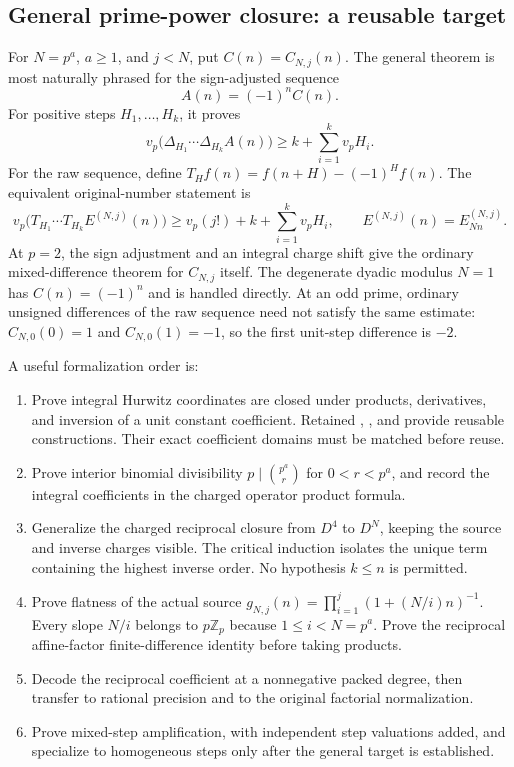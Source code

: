 \subsection{General prime-power closure: a reusable target}
For $N=p^a$, $a\ge1$, and $j<N$, put $C(n)=C_{N,j}(n)$. The general theorem is most naturally phrased for the sign-adjusted sequence
\[
 A(n)=(-1)^n C(n).
\]
For positive steps $H_1,\ldots,H_k$, it proves
\[
 v_p\bigl(\Delta_{H_1}\cdots\Delta_{H_k}A(n)\bigr)
 \ge k+\sum_{i=1}^k v_pH_i.
\]
For the raw sequence, define $T_H f(n)=f(n+H)-(-1)^Hf(n)$. The equivalent original-number statement is
\[
 v_p\bigl(T_{H_1}\cdots T_{H_k}E^{(N,j)}(n)\bigr)
 \ge v_p(j!)+k+\sum_{i=1}^k v_pH_i,
 \qquad E^{(N,j)}(n)=E_{Nn}^{(N,j)}.
\]
At $p=2$, the sign adjustment and an integral charge shift give the ordinary mixed-difference theorem for $C_{N,j}$ itself. The degenerate dyadic modulus $N=1$ has $C(n)=(-1)^n$ and is handled directly. At an odd prime, ordinary unsigned differences of the raw sequence need not satisfy the same estimate: $C_{N,0}(0)=1$ and $C_{N,0}(1)=-1$, so the first unit-step difference is $-2$.

A useful formalization order is:
\begin{enumerate}
\item Prove integral Hurwitz coordinates are closed under products, derivatives, and inversion of a unit constant coefficient. Retained , , and  provide reusable constructions. Their exact coefficient domains must be matched before reuse.
\item Prove interior binomial divisibility $p\mid\binom{p^a}{r}$ for $0<r<p^a$, and record the integral coefficients in the charged operator product formula.
\item Generalize the charged reciprocal closure from $D^4$ to $D^N$, keeping the source and inverse charges visible. The critical induction isolates the unique term containing the highest inverse order. No hypothesis $k\le n$ is permitted.
\item Prove flatness of the actual source $g_{N,j}(n)=\prod_{i=1}^j(1+(N/i)n)^{-1}$. Every slope $N/i$ belongs to $p\mathbb Z_p$ because $1\le i<N=p^a$. Prove the reciprocal affine-factor finite-difference identity before taking products.
\item Decode the reciprocal coefficient at a nonnegative packed degree, then transfer to rational precision and to the original factorial normalization.
\item Prove mixed-step amplification, with independent step valuations added, and specialize to homogeneous steps only after the general target is established.
\end{enumerate}

